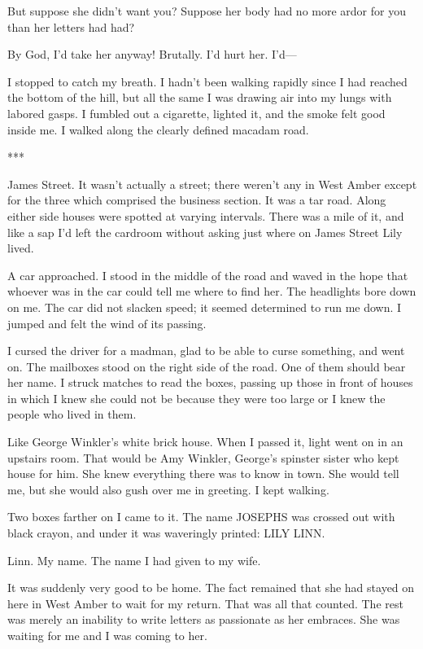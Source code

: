 \documentclass{novel}
\begin{document}
{But suppose she didn’t want you? Suppose her body had no more ardor for you than her letters had had?

By God, I’d take her anyway! Brutally. I’d hurt her. I’d—

I stopped to catch my breath. I hadn’t been walking rapidly since I had reached the bottom of the hill, but all the same I was drawing air into my lungs with labored gasps. I fumbled out a cigarette, lighted it, and the smoke felt good inside me. I walked along the clearly defined macadam road.

***

James Street. It wasn’t actually a street; there weren’t any in West Amber except for the three which comprised the business section. It was a tar road. Along either side houses were spotted at varying intervals. There was a mile of it, and like a sap I’d left the cardroom without asking just where on James Street Lily lived.

A car approached. I stood in the middle of the road and waved in the hope that whoever was in the car could tell me where to find her. The headlights bore down on me. The car did not slacken speed; it seemed determined to run me down. I jumped and felt the wind of its passing.

I cursed the driver for a madman, glad to be able to curse something, and went on. The mailboxes stood on the right side of the road. One of them should bear her name. I struck matches to read the boxes, passing up those in front of houses in which I knew she could not be because they were too large or I knew the people who lived in them.

Like George Winkler’s white brick house. When I passed it, light went on in an upstairs room. That would be Amy Winkler, George’s spinster sister who kept house for him. She knew everything there was to know in town. She would tell me, but she would also gush over me in greeting. I kept walking.

Two boxes farther on I came to it. The name JOSEPHS was crossed out with black crayon, and under it was waveringly printed: LILY LINN.

Linn. My name. The name I had given to my wife.

It was suddenly very good to be home. The fact remained that she had stayed on here in West Amber to wait for my return. That was all that counted. The rest was merely an inability to write letters as passionate as her embraces. She was waiting for me and I was coming to her.

}
\end{document}
